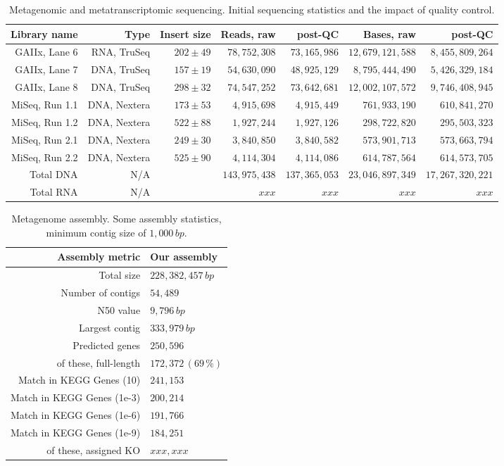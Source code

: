 \documentclass{bmcart}
\begin{document}
\begin{backmatter}
\begin{table}[h!]
\caption{Metagenomic and metatranscriptomic sequencing. Initial sequencing statistics and the impact of quality control.}
\begin{tabular}{rrrrrrr}
\hline
Library name & Type & Insert size & Reads, raw & post-QC & Bases, raw & post-QC\\
\hline
GAIIx, Lane 6 & RNA, TruSeq & $202 \pm 49$ & $78,752,308$ & $73,165,986$ & $12,679,121,588$ & $8,455,809,264$ \\
GAIIx, Lane 7 & DNA, TruSeq & $157 \pm 19$ & $54,630,090$ & $48,925,129$ & $8,795,444,490$ & $5,426,329,184$ \\
GAIIx, Lane 8 & DNA, TruSeq & $298 \pm 32$ & $74,547,252$ & $73,642,681$ & $12,002,107,572$ & $9,746,408,945$ \\
MiSeq, Run 1.1 & DNA, Nextera & $173 \pm 53$ & $4,915,698$ & $4,915,449$ & $761,933,190$ & $610,841,270$ \\
MiSeq, Run 1.2 & DNA, Nextera & $522 \pm 88$ & $1,927,244$ & $1,927,126$ & $298,722,820$ & $295,503,323$ \\
MiSeq, Run 2.1 & DNA, Nextera & $249 \pm 30$ & $3,840,850$ & $3,840,582$ & $573,901,713$ & $573,663,794$ \\
MiSeq, Run 2.2 & DNA, Nextera & $525 \pm 90$ & $4,114,304$ & $4,114,086$ & $614,787,564$ & $614,573,705$ \\
\hline
Total DNA & N/A & & $143,975,438$ & $137,365,053$ & $23,046,897,349$ & $17,267,320,221$ \\
Total RNA & N/A & & $xxx$ & $xxx$ & $xxx$ & $xxx$ \\
\hline
\end{tabular}
\label{tReads}
\end{table}

\begin{table}[h!]
\caption{Metagenome assembly. Some assembly statistics, minimum contig size of $1,000\,bp$.}
\begin{tabular}{rl}
\hline
Assembly metric & Our assembly\\
\hline
Total size & $228,382,457\,bp$\\
Number of contigs & $54,489$\\
N50 value & $9,796\,bp$\\
Largest contig & $333,979\,bp$\\
\hline
Predicted genes & $250,596$\\
of these, full-length & $172,372\,(69\,\%)$\\
Match in KEGG Genes (10) & $241,153$\\
Match in KEGG Genes (1e-3) & $200,214$\\
Match in KEGG Genes (1e-6) & $191,766$\\
Match in KEGG Genes (1e-9) & $184,251$\\
of these, assigned KO & $xxx,xxx$\\
\hline
\end{tabular}
\label{tAssembly}
\end{table}


\end{backmatter}
\end{document}
